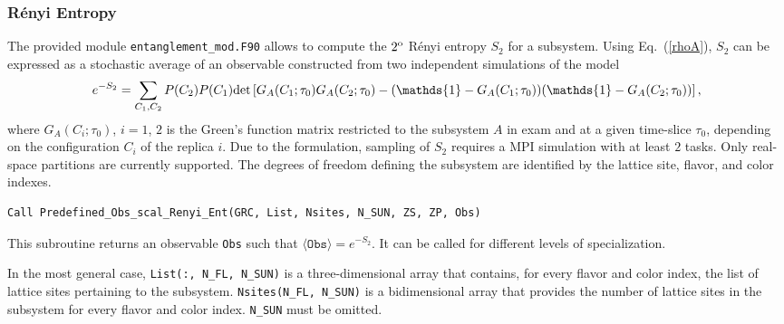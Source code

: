 %
\subsubsection{R{\'e}nyi Entropy}
\label{sec:renyi}
The provided module \texttt{entanglement\_mod.F90} allows to compute the $2^{\rm o}$ R\'enyi entropy $S_2$ for a subsystem.
Using Eq.~(\ref{rhoA}), $S_2$ can be expressed as a stochastic average of an observable constructed from two independent simulations of the model \cite{Grover13}
\begin{equation}
e^{-S_2} = \sum_{C_1,C_2} P(C_2) P(C_1) {\rm det}\left[G_A(C_1; \tau_0)G_A(C_2; \tau_0)-(\mathds{1} - G_A(C_1; \tau_0))(\mathds{1} - G_A(C_2; \tau_0))\right],
\label{renyi_obs}
\end{equation}
where $G_A(C_i; \tau_0)$, $i=1$, $2$ is the Green's function matrix restricted to the subsystem $A$ in exam and at a given time-slice $\tau_0$, depending on the configuration $C_i$ of the replica $i$.
Due to the formulation, sampling of $S_2$ requires a MPI simulation with at least $2$ tasks.
Only real-space partitions are currently supported.
The degrees of freedom defining the subsystem are identified by the lattice site, flavor, and color indexes.

\begin{lstlisting}[style=fortran]
Call Predefined_Obs_scal_Renyi_Ent(GRC, List, Nsites, N_SUN, ZS, ZP, Obs)
\end{lstlisting}
This subroutine returns an observable \texttt{Obs} such that $\langle\texttt{Obs}\rangle=e^{-S_2}$.
It can be called for different levels of specialization.

In the most general case, \texttt{List(:, N\_FL, N\_SUN)} is a three-dimensional array that contains, for every flavor and color index, the list of lattice sites pertaining to the subsystem. \texttt{Nsites(N\_FL, N\_SUN)} is a bidimensional array that provides the number of lattice sites in the subsystem for every flavor and color index. \texttt{N\_SUN} must be omitted.

